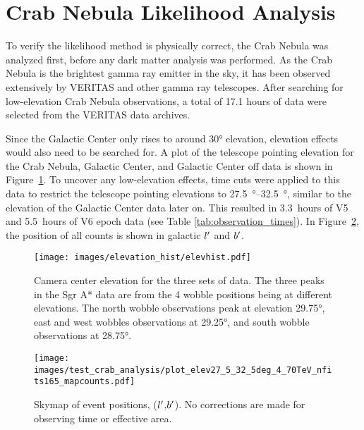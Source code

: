 \section{Crab Nebula Likelihood Analysis}\label{sec:crab_analysis}
  To verify the likelihood method is physically correct, the Crab Nebula was analyzed first, before any dark matter analysis was performed.
  As the Crab Nebula is the brightest gamma ray emitter in the sky, it has been observed extensively by VERITAS and other gamma ray telescopes.
  After searching for low-elevation Crab Nebula observations, a total of 17.1 hours of data were selected from the VERITAS data archives.
  
  Since the Galactic Center only rises to around \ang{30} elevation, elevation effects would also need to be searched for.
  A plot of the telescope pointing elevation for the Crab Nebula, Galactic Center, and Galactic Center off data is shown in Figure~\ref{fig:datapointingelevations}.
  To uncover any low-elevation effects, time cuts were applied to this data to restrict the telescope pointing elevations to \SIrange{27.5}{32.5}{\degree}, similar to the elevation of the Galactic Center data later on.
  This resulted in \SI{3.3}{hours} of V5 and \SI{5.5}{hours} of V6 epoch data (see Table \ref{tab:observation_times}).
  In Figure~\ref{fig:crab_skymap}, the position of all counts is shown in galactic $l'$ and $b'$.

  \begin{figure}[!ht]
    \centering
    \texttt{[image: images/elevation\_hist/elevhist.pdf]}
    \caption[VERITAS Data Elevation Exposure]{
      Camera center elevation for the three sets of data.
      The three peaks in the Sgr A* data are from the 4 wobble positions being at different elevations.
      The north wobble observations peak at elevation \nicetilde\ang{29.75}, east and west wobbles observations at \nicetilde\ang{29.25}, and south wobble observations at \nicetilde\ang{28.75}.
    }
    \label{fig:datapointingelevations}
  \end{figure}

    
  \begin{figure}[tb]
    \centering
    \texttt{[image: images/test\_crab\_analysis/plot\_elev27\_5\_32\_5deg\_4\_70TeV\_nfits165\_mapcounts.pdf]}
    \caption[Crab Nebula Counts Skymap]
    {
      Skymap of event positions, ($l'$,$b'$).
      No corrections are made for observing time or effective area.
    }
    \label{fig:crab_skymap}
  \end{figure}
  
